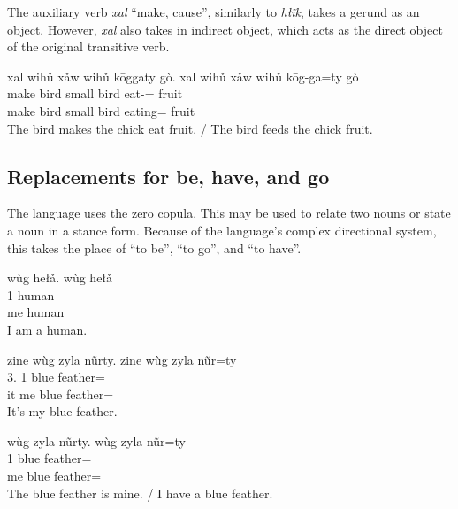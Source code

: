 The auxiliary verb \textit{xal} ``make, cause'',
similarly to \textit{hłĩk},
takes a gerund as an object.
However, \textit{xal} also takes in indirect object,
which acts as the direct object of the original transitive verb.

\begin{exe}
    \ex
    \glt
    xal wihǔ xǎw wihǔ kōggaty gò.
    \glll
    xal wihǔ xǎw wihǔ kōg-ga=ty gò \\
    make bird small bird eat-\Ger{}=\Poss{} fruit \\
    make bird small bird eating=\Poss{} fruit \\
    \glt
    The bird makes the chick eat fruit.
    /
    The bird feeds the chick fruit.
\end{exe}

\subsection{Replacements for be, have, and go}\label{subsec:replacements-for-be-have-and-go}

The language uses the zero copula.
This may be used to relate two nouns
or state a noun in a stance form.
Because of the language's complex directional system,
this takes the place of ``to be'', ``to go'', and ``to have''.

\begin{exe}
    \ex
    \glt
    wùg hełǎ.
    \glll
    wùg hełǎ \\
    1\Sg{} human \\
    me human \\
    \glt
    I am a human.
\end{exe}

\begin{exe}
    \ex
    \glt
    zine wùg zyla nũrty.
    \glll
    zine wùg zyla nũr=ty \\
    3\Sg{}.\Inanim{} 1\Sg{} blue feather=\Poss{} \\
    it me blue feather=\Poss{} \\
    \glt
    It's my blue feather.
\end{exe}

\begin{exe}
    \ex
    \glt
    wùg zyla nũrty.
    \glll
    wùg zyla nũr=ty \\
    1\Sg{} blue feather=\Poss{} \\
    me blue feather=\Poss{} \\
    \glt
    The blue feather is mine.
    /
    I have a blue feather.
\end{exe}

